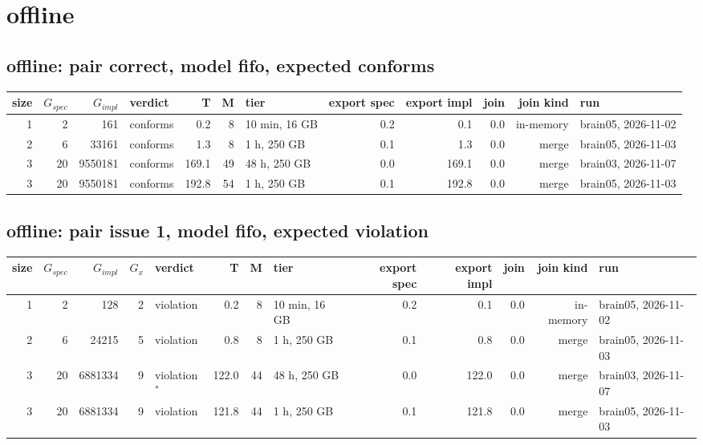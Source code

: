 \documentclass[10pt]{article}
\begin{document}
\section*{offline}
\subsection*{offline: pair \textsf{correct}, model fifo, expected conforms}
\begin{longtable}{@{}rrrlrrlrrrrl@{}}
\toprule
size & $G_{\mathit{spec}}$ & $G_{\mathit{impl}}$ & verdict & T & M & tier & export spec & export impl & join & join kind & run \\
\midrule
\endhead
\color{red} 1 & 2 & 161 & conforms & 0.2 & 8 & 10 min, 16 GB & 0.2 & 0.1 & 0.0 & in-memory & brain05, 2026-11-02 \\
\color{blue} 2 & 6 & 33161 & conforms & 1.3 & 8 & 1 h, 250 GB & 0.1 & 1.3 & 0.0 & merge & brain05, 2026-11-03 \\
\color{blue} 3 & 20 & 9550181 & conforms & 169.1 & 49 & 48 h, 250 GB & 0.0 & 169.1 & 0.0 & merge & brain03, 2026-11-07 \\
\color{blue} 3 & 20 & 9550181 & conforms & 192.8 & 54 & 1 h, 250 GB & 0.1 & 192.8 & 0.0 & merge & brain05, 2026-11-03 \\
\bottomrule
\end{longtable}
\subsection*{offline: pair \textsf{issue 1}, model fifo, expected violation}
\begin{longtable}{@{}rrrrlrrlrrrrl@{}}
\toprule
size & $G_{\mathit{spec}}$ & $G_{\mathit{impl}}$ & $G_x$ & verdict & T & M & tier & export spec & export impl & join & join kind & run \\
\midrule
\endhead
\color{red} 1 & 2 & 128 & 2 & violation & 0.2 & 8 & 10 min, 16 GB & 0.2 & 0.1 & 0.0 & in-memory & brain05, 2026-11-02 \\
\color{blue} 2 & 6 & 24215 & 5 & violation & 0.8 & 8 & 1 h, 250 GB & 0.1 & 0.8 & 0.0 & merge & brain05, 2026-11-03 \\
\color{blue} 3 & 20 & 6881334 & 9 & violation$^{\ast}$ & 122.0 & 44 & 48 h, 250 GB & 0.0 & 122.0 & 0.0 & merge & brain03, 2026-11-07 \\
\color{blue} 3 & 20 & 6881334 & 9 & violation & 121.8 & 44 & 1 h, 250 GB & 0.1 & 121.8 & 0.0 & merge & brain05, 2026-11-03 \\
\bottomrule
\end{longtable}
\end{document}
